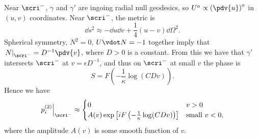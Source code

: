 \documentclass{jknotes}
\begin{document}
Near \(\scri^-\), \(\gamma\) and \(\gamma'\) are ingoing radial null geodesics, so \(U^a\propto\left(\pdv{u}\right)^a\) in \((u,v)\) coordinates. Near \(\scri^-\), the metric is
\begin{equation}
    \dd{s}^2\approx -\dd{u}\dd{v} + \frac{1}{4} (u-v)\dd{\Omega}^2.
\end{equation}
Spherical symmetry, \(N^2=0\), \(U\vdot N=-1\) together imply that \(\left.N\right|_{\scri^-}=D^{-1}\pdv{v}\), where \(D>0\) is a constant. From this we have that \(\gamma'\) intersects \(\scri^-\) at \(v=\epsilon D^{-1}\), and thus on \(\scri^-\) at small \(v\) the phase is
\begin{equation}
    S = F\left(-\frac{1}{\kappa}\log(CDv)\right).
\end{equation}
Hence we have
\begin{equation}
    \left.p_i^{(2)}\right|_{\scri^-} \approx
    \begin{cases}
        0 & v > 0 \\
        A(v)\exp\left[iF\left(-\frac{1}{\kappa}\log(CDv)\right)\right] & \text{small \(v<0\)},
    \end{cases}
\end{equation}
where the amplitude \(A(v)\) is some smooth function of \(v\).
\end{document}
